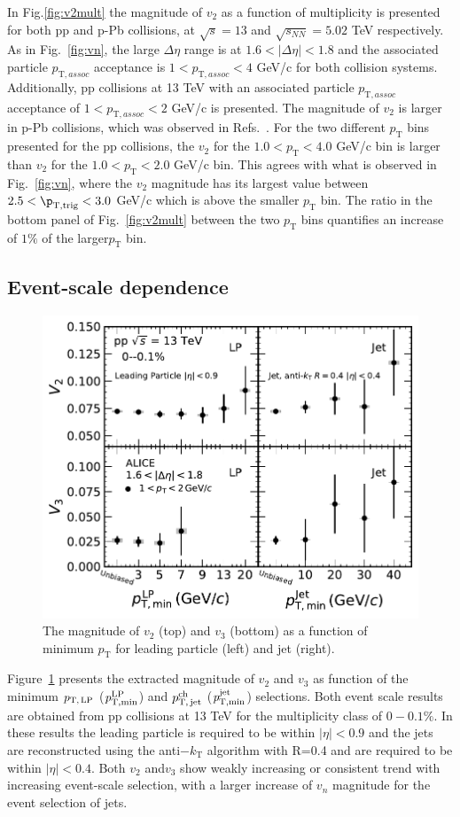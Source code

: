 In Fig.\ref{fig:v2mult} the magnitude of $v_2$ as a function of multiplicity is presented for both pp and p-Pb collisions, at $\sqrt{s}=13$ and $\sqrt{s_{NN}}=5.02$ TeV respectively. As in Fig.~\ref{fig:vn}, the large $\Delta\eta$ range is at $1.6<|\Delta\eta|<1.8$ and the associated particle $p_{\mathrm{T},assoc}$ acceptance is $1<p_{\mathrm{T},assoc}<4$ GeV/c for both collision systems. Additionally, pp collisions at 13 TeV with an associated particle $p_{\mathrm{T},assoc}$ acceptance of $1<p_{\mathrm{T},assoc}<2$ GeV/c is presented. The magnitude of $v_2$ is larger in p-Pb collisions, which was observed in Refs.~\cite{ATLAS:2015hzw,ATLAS:2016yzd, Khachatryan:2015lva}. For the two different $p_\mathrm{T}$ bins presented for the pp collisions, the $v_2$ for the $1.0<p_\mathrm{T}<4.0$ GeV/c bin is larger than $v_2$ for the $1.0<p_\mathrm{T}<2.0$ GeV/c bin. This agrees with what is observed in Fig.~\ref{fig:vn}, where the $v_2$ magnitude has its largest value between $2.5<\p_{\mathrm{T,trig}}<3.0$ GeV/c which is above the smaller $p_\mathrm{T}$ bin. The ratio in the bottom panel of Fig.~\ref{fig:v2mult} between the two $p_\mathrm{T}$ bins quantifies an increase of $1\%$ of the larger$p_\mathrm{T}$ bin.
%

\subsection{Event-scale dependence}
\begin{figure}[h!]
	\centering
	\includegraphics[width=0.6 \textwidth]{figures/Fig4_vn_LP.pdf}
	\caption{The magnitude of $v_2$ (top) and $v_3$ (bottom) as a function of minimum $p_{\mathrm{T}}$ for leading particle (left) and jet (right).}
	\label{fig:LPjet23}
\end{figure}    

Figure~\ref{fig:LPjet23} presents the extracted magnitude of $v_2$ and $v_3$ as function of the minimum $p_\mathrm{T,\,LP}$ ($\it{p}^{\rm{LP}}_{\rm{T,min}}$) and $p_\mathrm{T,\,jet}^\mathrm{ch}$ ($\it{p}^{\rm{jet}}_{\rm{T,min}}$) selections. Both event scale results are obtained from pp collisions at 13 TeV for the multiplicity class of $0-0.1\%$. In these results the leading particle is required to be within $|\eta|<0.9$ and the jets are reconstructed using the anti$-k_\mathrm{T}$ algorithm with R=0.4 and are required to be within $|\eta|<0.4$. Both $v_2$ and$v_3$ show weakly increasing or consistent trend with increasing event-scale selection, with a larger increase of $v_n$ magnitude for the event selection of jets. 